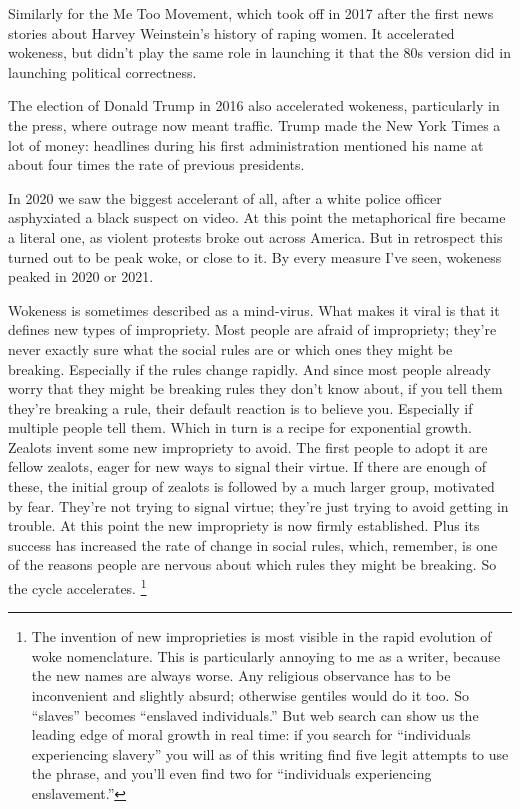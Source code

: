 Similarly for the Me Too Movement, which took off in 2017 after the
first news stories about Harvey Weinstein's history of raping women. It
accelerated wokeness, but didn't play the same role in launching it that
the 80s version did in launching political correctness.

The election of Donald Trump in 2016 also accelerated wokeness,
particularly in the press, where outrage now meant traffic. Trump made
the New York Times a lot of money: headlines during his first
administration mentioned his name at about four times the rate of
previous presidents.

In 2020 we saw the biggest accelerant of all, after a white police
officer asphyxiated a black suspect on video. At this point the
metaphorical fire became a literal one, as violent protests broke out
across America. But in retrospect this turned out to be peak woke, or
close to it. By every measure I've seen, wokeness peaked in 2020 or
2021.

Wokeness is sometimes described as a mind-virus. What makes it viral is
that it defines new types of impropriety. Most people are afraid of
impropriety; they're never exactly sure what the social rules are or
which ones they might be breaking. Especially if the rules change
rapidly. And since most people already worry that they might be breaking
rules they don't know about, if you tell them they're breaking a rule,
their default reaction is to believe you. Especially if multiple people
tell them. Which in turn is a recipe for exponential growth. Zealots
invent some new impropriety to avoid. The first people to adopt it are
fellow zealots, eager for new ways to signal their virtue. If there are
enough of these, the initial group of zealots is followed by a much
larger group, motivated by fear. They're not trying to signal virtue;
they're just trying to avoid getting in trouble. At this point the new
impropriety is now firmly established. Plus its success has increased
the rate of change in social rules, which, remember, is one of the
reasons people are nervous about which rules they might be breaking. So
the cycle accelerates. \footnote{The invention of new improprieties is most visible in the rapid
evolution of woke nomenclature. This is particularly annoying to me as a
writer, because the new names are always worse. Any religious observance
has to be inconvenient and slightly absurd; otherwise gentiles would do
it too. So ``slaves'' becomes ``enslaved individuals.'' But web search
can show us the leading edge of moral growth in real time: if you search
for ``individuals experiencing slavery'' you will as of this writing
find five legit attempts to use the phrase, and you'll even find two for
``individuals experiencing enslavement.''}

